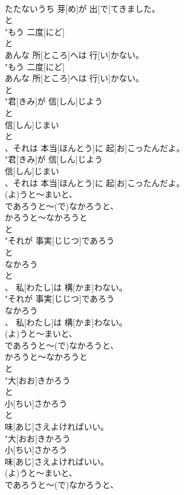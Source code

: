 \documentclass[8pt]{extreport}
\begin{document}
\begin{CJK}{UTF8}{min}
\\	たたないうち 芽[め]が 出[で]てきました。
\\	と
\\	"もう 二度[にど]
\\	と
\\	あんな 所[ところ]へは 行[い]かない。
\\	"もう 二度[にど]
\\	あんな 所[ところ]へは 行[い]かない。
\\	と
\\	"君[きみ]が 信[しん]じよう
\\	と
\\	信[しん]じまい
\\	と
\\	、それは 本当[ほんとう]に 起[お]こったんだよ。
\\	"君[きみ]が 信[しん]じよう
\\	信[しん]じまい
\\	、それは 本当[ほんとう]に 起[お]こったんだよ。
\\	(よ)うと～まいと、
\\	であろうと～(で)なかろうと、
\\	かろうと～なかろうと	
\\	と
\\	"それが 事実[じじつ]であろう
\\	と
\\	なかろう
\\	と
\\	、 私[わたし]は 構[かま]わない。
\\	"それが 事実[じじつ]であろう
\\	なかろう
\\	、 私[わたし]は 構[かま]わない。
\\	(よ)うと～まいと、
\\	であろうと～(で)なかろうと、
\\	かろうと～なかろうと	
\\	と
\\	"大[おお]きかろう
\\	と
\\	小[ちい]さかろう
\\	と
\\	味[あじ]さえよければいい。
\\	"大[おお]きかろう
\\	小[ちい]さかろう
\\	味[あじ]さえよければいい。
\\	(よ)うと～まいと、
\\	であろうと～(で)なかろうと、

\end{CJK}
\end{document}
